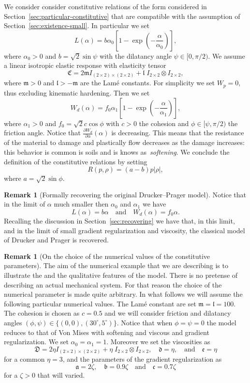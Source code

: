 \documentclass[a4paper,10pt,oneside]{amsbook}
\numberwithin{section}{chapter}
\numberwithin{equation}{chapter}
\theoremstyle{definition}
\newtheorem{rmk}[prop]{Remark}
\newcommand{\dind}[2]{\frac{\partial #1}{\partial #2}}
\begin{document}
We consider consider constitutive relations of the form considered in Section~\ref{sec:particular-constitutive} that are compatible with the assumption of Section~\ref{sec:existence-small}. In particular we set
\[
L(\alpha)=b\alpha_0\left[1-\exp\left(-\frac{\alpha}{\alpha_0}\right)\right],
\]
where $\alpha_0>0$ and $b=\sqrt{2}\sin\psi$ with the dilatancy angle $\psi\in[0,\pi/2)$. We assume a linear isotropic elastic response with elasticity tensor
\[
\mathfrak{C}=2\mathfrak{m}I_{(2\times2)\times(2\times2)}+\mathfrak{l}\;I_{2\times2}\otimes I_{2\times2},
\]
where $\mathfrak{m}>0$ and $\mathfrak{l}>-\mathfrak{m}$ are the Lamé constants. For simplicity we set $W_p=0$, thus excluding kinematic hardening. Then we set
\[
W_d(\alpha)=f_0\alpha_1\left[1-\exp\left(-\frac{\alpha}{\alpha_1}\right)\right],
\]
where $\alpha_1>0$ and $f_0=\sqrt{2}c\cos\phi$ with $c>0$ the cohesion and $\phi\in[\psi,\pi/2)$ the friction angle. Notice that $\dind{W_d}{\alpha}(\alpha)$ is decreasing. This means that the resistance of the material to damage and plastically flow decreases as the damage increases: this behavior is common is soils and is knows as~\emph{softening}. We conclude the definition of the constitutive relations by setting
\[
R(p,\rho)=(a-b)p|\rho|,
\]
where $a=\sqrt{2}\sin\phi$.
\begin{rmk}[Formally recovering the original Drucker--Prager model]
Notice that in the limit of $\alpha$ much smaller then $\alpha_0$ and $\alpha_1$ we have
\[
L(\alpha)=b\alpha\quad\text{and}\quad W_d(\alpha)=f_0\alpha.
\]
Recalling the discussion in Section~\ref{sec:recovering} we have that, in this limit, and in the limit of small gradient regularization and viscosity, the classical model of Drucker and Prager is recovered.
\end{rmk}
\begin{rmk}[On the choice of the numerical values of the constitutive parameters]
The aim of the numerical example that we are describing is to illustrate the and the qualitative features of the model. There is no pretense of describing an actual mechanical system. For that reason the choice of the numerical parameter is made quite arbitrary. In what follows we will assume the following particular numerical values. The Lamé constant are set $\mathfrak{m}=\mathfrak{l}=100$. The cohesion is chosen as $c=0.5$ and we will consider friction and dilatancy angles $(\phi,\psi)\in\{(0,0),(30^\circ,5^\circ)\}$. Notice that when $\phi=\psi=0$ the model reduces to that of Von Mises with softening and viscous and gradient regularization. We set $\alpha_0=\alpha_1=1$. Moreover we set the viscosities as
\[
\mathfrak{D}=2\eta I_{(2\times2)\times(2\times2)}+\eta\;I_{2\times2}\otimes I_{2\times2},\quad\mathfrak{d}=\eta,\quad\text{and}\quad\mathfrak{e}=\eta
\]
for a common $\eta=3$, and the parameters of the gradient regularization as
\[
\mathfrak{a}=2\zeta,\quad\mathfrak{b}=0.9\zeta\quad\text{and}\quad\mathfrak{c}=0.7\zeta
\]
for a $\zeta>0$ that will varied.
\end{rmk}
\end{document}
